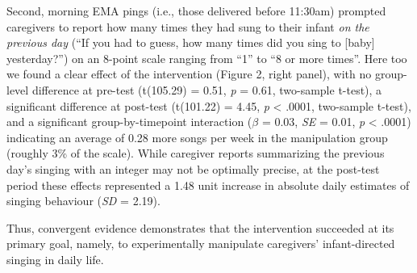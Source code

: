 \documentclass[
]{article}
\begin{document}
Second, morning EMA pings (i.e., those delivered before 11:30am)
prompted caregivers to report how many times they had sung to their
infant \emph{on the previous day} (``If you had to guess, how many times
did you sing to {[}baby{]} yesterday?'') on an 8-point scale ranging
from ``1'' to ``8 or more times''. Here too we found a clear effect of
the intervention (Figure 2, right panel), with no group-level difference
at pre-test (t(105.29) = 0.51, \emph{p} = 0.61, two-sample t-test), a
significant difference at post-test (t(101.22) = 4.45, \emph{p}
\textless{} .0001, two-sample t-test), and a significant
group-by-timepoint interaction (\(\beta\) = 0.03, \emph{SE} = 0.01,
\emph{p} \textless{} .0001) indicating an average of 0.28 more songs per
week in the manipulation group (roughly 3\% of the scale). While
caregiver reports summarizing the previous day's singing with an integer
may not be optimally precise, at the post-test period these effects
represented a 1.48 unit increase in absolute daily estimates of singing
behaviour (\emph{SD} = 2.19).

Thus, convergent evidence demonstrates that the intervention succeeded
at its primary goal, namely, to experimentally manipulate caregivers'
infant-directed singing in daily life.
\end{document}
